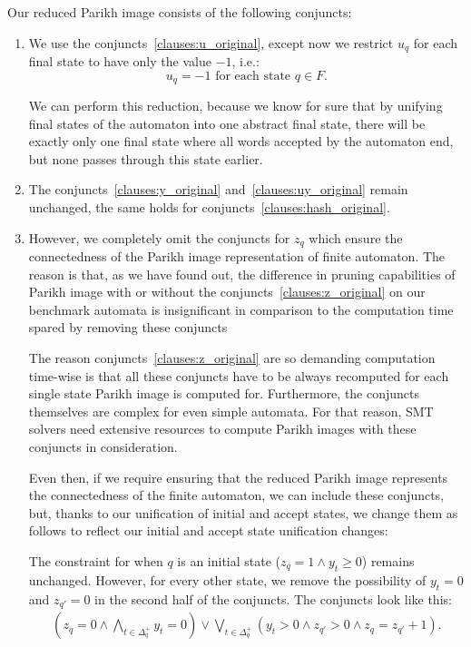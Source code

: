 Our reduced Parikh image consists of the following conjuncts:
\begin{enumerate}
    \item \label{clauses:u_reduced} We use the conjuncts~\ref{clauses:u_original}, except now we restrict $u_q$ for each final state to have only the value $-1$, i.e.:
    $$ u_{q} = -1 \text{ for each state } q \in F \text{.}$$

    We can perform this reduction, because we know for sure that by unifying final states of the automaton into one abstract final state, there will be exactly only one final state where all words accepted by the automaton end, but none passes through this state earlier.

    \item \label{clauses:y_reduced} \label{clauses:uy_reduced} \label{clauses:hash_reduced} The conjuncts~\ref{clauses:y_original} and~\ref{clauses:uy_original} remain unchanged, the same holds for conjuncts~\ref{clauses:hash_original}.
    \item \label{clauses:z_reduced} However, we completely omit the conjuncts for $z_{q}$ which ensure the connectedness of the Parikh image representation of finite automaton. The reason is that, as we have found out, the difference in pruning capabilities of Parikh image with or without the conjuncts~\ref{clauses:z_original} on our benchmark automata is insignificant in comparison to the computation time spared by removing these conjuncts %

    The reason conjuncts~\ref{clauses:z_original} are so demanding computation time-wise is that all these conjuncts have to be always recomputed for each single state Parikh image is computed for. Furthermore, the conjuncts themselves are complex for even simple automata. For that reason, SMT solvers need extensive resources to compute Parikh images with these conjuncts in consideration.

    Even then, if we require ensuring that the reduced Parikh image represents the connectedness of the finite automaton, we can include these conjuncts, but, thanks to our unification of initial and accept states, we change them as follows to reflect our initial and accept state unification changes:

    The constraint for when $q$ is an initial state ($z_q = 1 \land y_t \geq 0$) remains unchanged. However, for every other state, we remove the possibility of $y_t = 0$ and $z_{q'} = 0$ in the second half of the conjuncts. The conjuncts look like this:
    {
    \begin{align*}
		(z_q = 0 \land \bigwedge_{t \in \Delta_q^+} y_t = 0) \lor \bigvee_{t \in \Delta_q^+} (y_t > 0 \land z_{q'} > 0 \land z_q = z_{q'} + 1) \text{.}
    \end{align*}
    }

\end{enumerate}


